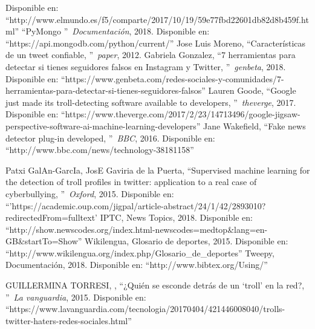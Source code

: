 \documentclass[../all.tex]{subfiles}
\begin{document}
\begin{thebibliography}{37}
		Disponible en: ``http://www.elmundo.es/f5/comparte/2017/10/19/59e77fbd22601db82d8b459f.html''
		\textquotedblleft PyMongo
		\textquotedblright\ \textit{Documentación},
		2018.
		Disponible en: ``https://api.mongodb.com/python/current/''
		Jose Luis Moreno, 
		\textquotedblleft Características de un tweet confiable,
		\textquotedblright\ \textit{paper},
		2012.
		Gabriela Gonzalez, 
		\textquotedblleft 7 herramientas para detectar si tienes seguidores falsos en Instagram y Twitter,
		\textquotedblright\ \textit{genbeta},
		2018.
		Disponible en: ``https://www.genbeta.com/redes-sociales-y-comunidades/7-herramientas-para-detectar-si-tienes-seguidores-falsos''
		Lauren Goode, 
		\textquotedblleft Google just made its troll-detecting software available to developers,
		\textquotedblright\ \textit{theverge},
		2017.
		Disponible en: ``https://www.theverge.com/2017/2/23/14713496/google-jigsaw-perspective-software-ai-machine-learning-developers''
		Jane Wakefield, 
		\textquotedblleft Fake news detector plug-in developed,
		\textquotedblright\ \textit{BBC},
		2016.
		Disponible en: ``http://www.bbc.com/news/technology-38181158''

		Patxi GalAn-GarcIa, JosE Gaviria de la Puerta, 
		\textquotedblleft Supervised machine learning for the detection of troll profiles in twitter: application to a real case of cyberbullying,
		\textquotedblright\ \textit{Oxford},
		2015.
		Disponible en: ``'https://academic.oup.com/jigpal/article-abstract/24/1/42/2893010?redirectedFrom=fulltext'
		IPTC, 
		 News Topics,
		2018.
		Disponible en: ``http://show.newscodes.org/index.html-newscodes=medtop\&lang=en-GB\&startTo=Show''
		Wikilengua, 
	    Glosario de deportes,
		2015.
		Disponible en: ``http://www.wikilengua.org/index.php/Glosario\_de\_deportes''
		 Tweepy,
		 Documentación,
		2018.
		Disponible en: ``http://www.bibtex.org/Using/''

		GUILLERMINA TORRESI, , 
		\textquotedblleft ¿Quién se esconde detrás de un ‘troll’ en la red?,
		\textquotedblright\ \textit{La vanguardia},
		2015.
		Disponible en: ``https://www.lavanguardia.com/tecnologia/20170404/421446008040/trolls-twitter-haters-redes-sociales.html''


\end{thebibliography}
\end{document}
